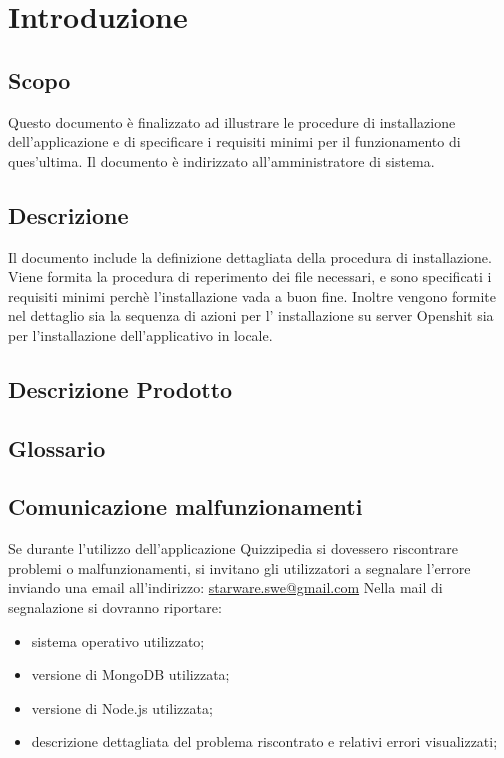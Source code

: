 \documentclass[12pt,a4paper]{article}
\begin{document}
	\newpage
	\tableofcontents
	\newpage
	\listoftables
	\listoffigures
	\newpage
	
	
	\section{Introduzione}	\label{intro}
	
	\subsection{Scopo}
	Questo documento è finalizzato ad illustrare le procedure di installazione dell'applicazione \prj{} e di specificare i requisiti minimi per il funzionamento di ques'ultima. Il documento è indirizzato all'amministratore di sistema.
	\subsection{Descrizione}
    Il documento include la definizione dettagliata della procedura di installazione. Viene formita la procedura di reperimento dei file necessari, e sono specificati i requisiti minimi perchè l'installazione vada a buon fine.
    Inoltre vengono formite nel dettaglio sia la sequenza di azioni per l' installazione su server Openshit sia per l'installazione dell'applicativo in locale.
   
	
	\subsection{Descrizione Prodotto}
	\descrizioneProdotto
	
	\subsection{Glossario}
	\glossarioPrint
	\subsection{Comunicazione malfunzionamenti}
		Se durante l’utilizzo dell’applicazione Quizzipedia si dovessero riscontrare problemi o
		malfunzionamenti, si invitano gli utilizzatori a segnalare l’errore inviando una email
		all’indirizzo:
		\url{starware.swe@gmail.com}
		Nella mail di segnalazione si dovranno riportare:
		\begin{itemize}
			\item sistema operativo utilizzato;
			\item versione di MongoDB utilizzata;
			\item versione di Node.js utilizzata;
			\item descrizione dettagliata del problema riscontrato e relativi errori visualizzati;
		\end{itemize}
\end{document}
